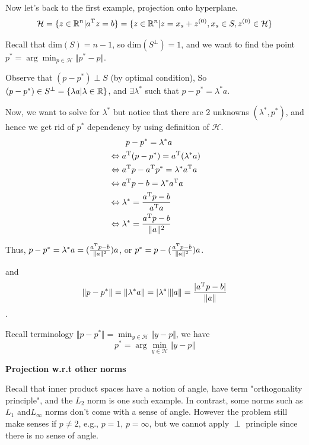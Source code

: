 \vspace{0.3cm}
Now let's back to the first example, projection onto hyperplane.
$$\mathcal{H}=\{z\in\mathbb{R}^{n}\vert a^{{\rm T}} z=b\}=\{z\in\mathbb{R}^{n}|z=x_{s}+z^{(0)},x_{s}\in S, z^{(0)}\in \mathcal{H}\}$$

\begin{figure}
	\centering
	\resizebox{7.5cm}{3cm}{}
	\caption{}
	\label{}
\end{figure}

Recall that $\text{dim}(S)=n-1$, so $\text{dim}(S^{\perp})=1$, and we want to find the point $p^{*}=\arg \min_{p\in \mathcal{H}} \Vert p^{*}-p\Vert$.

Observe that $(p-p^{*}) \perp S$ (by optimal condition), So $(p-p^{*}) \in S^{\perp}=\{\lambda a|\lambda \in \mathbb{R} \}$, and $\exists \lambda^{*}$ such that $p-p^{*}=\lambda^{*}a$.

Now, we want to solve for $\lambda^{*}$ but notice that there are 2 unknowns $(\lambda^{*},p^{*})$, and hence we get rid of $p^{*}$ dependency by using definition of $\mathcal{H}$.
\begin{align*}
&\qquad p-p^{*}=\lambda^{*}a\\
&\Leftrightarrow a^{{\rm T}} (p-p^{*})=a^{{\rm T}} (\lambda^{*}a)\\
&\Leftrightarrow a^{{\rm T}} p-a^{{\rm T}} p^{*}=\lambda^{*}a^{{\rm T}} a\\
&\Leftrightarrow a^{{\rm T}} p-b=\lambda^{*}a^{{\rm T}} a\\
&\Leftrightarrow \lambda^{*}=\frac{a^{{\rm T}} p-b}{a^{{\rm T}} a}\\
&\Leftrightarrow \lambda^{*}=\frac{a^{{\rm T}} p-b}{\Vert a\Vert^{2}}\\
\end{align*}

Thus, $p-p^{*}=\lambda^{*} a=(\frac{a^{{\rm T}} p-b}{\Vert a\Vert^{2}})a$, or $p^{*}=p-(\frac{a^{{\rm T}} p-b}{\Vert a\Vert^{2}})a$.

and 
$$\Vert p-p^{*}\Vert=\Vert \lambda^{*}a\Vert= \vert \lambda^{*}\vert \Vert a\Vert=\frac{\vert a^{{\rm T}} p-b\vert}{\Vert a\Vert}$$.

Recall terminology $\Vert p-p^{*}\Vert=\min_{y\in \mathcal{H}} \Vert y-p\Vert$, we have
$$p^{*}=\arg\min_{y\in \mathcal{H}} \Vert y-p\Vert$$


\vspace{0.5cm}
\noindent\textbf{Projection w.r.t other norms}

Recall that inner product spaces have a notion of angle, have term "orthogonality principle", and the $L_{2}$ norm is one such example. In contrast, some norms such as $L_{1}$ and$ L_{\infty}$ norms don't come with a sense of angle. However the problem still make senses if $p\neq 2$, e.g., $p=1$, $p=\infty$, but we cannot apply $\perp$ principle since there is no sense of angle.

